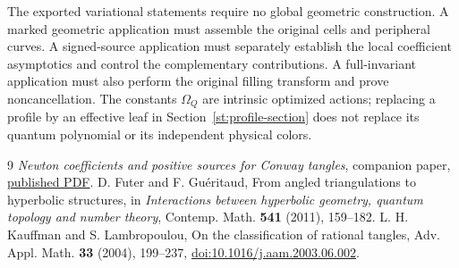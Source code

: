 \documentclass[11pt]{article}
\numberwithin{equation}{section}
\theoremstyle{definition}\newtheorem{definition}[theorem]{Definition}
\theoremstyle{remark}\newtheorem{remark}[theorem]{Remark}
\begin{document}
The exported variational statements require no global geometric
construction. A marked geometric application must assemble the
original cells and peripheral curves. A signed-source application must separately establish the local
coefficient asymptotics and control the complementary contributions.
A full-invariant application must also perform the original filling
transform and prove noncancellation. The constants $\Omega_Q$ are
intrinsic optimized actions; replacing a profile by an effective
leaf in Section~\ref{st:profile-section} does not replace its
quantum polynomial or its independent physical colors.

\begin{thebibliography}{9}
\emph{Newton coefficients and positive sources for Conway tangles},
companion paper, \href{https://sashakolpakov.github.io/murakamis_dream/papers/newton-tangles.pdf}{published PDF}.
D. Futer and F. Gu\'eritaud,
From angled triangulations to hyperbolic structures,
in \emph{Interactions between hyperbolic geometry, quantum topology
and number theory}, Contemp. Math. \textbf{541} (2011), 159--182.
L. H. Kauffman and S. Lambropoulou,
On the classification of rational tangles,
Adv. Appl. Math. \textbf{33} (2004), 199--237,
\href{https://doi.org/10.1016/j.aam.2003.06.002}{doi:10.1016/j.aam.2003.06.002}.
\end{thebibliography}
\end{document}
